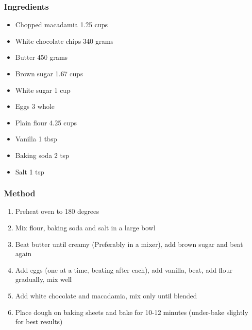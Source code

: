 \documentclass[]{article}
\begin{document}
\subsubsection*{\Large Ingredients}
\begin{multicols}{2}
\begin{itemize}
 \item Chopped macadamia \hfill 1.25 cups
 \item White chocolate chips \hfill 340 grams
 \item Butter \hfill 450 grams
 \item Brown sugar \hfill 1.67 cups
 \item White sugar \hfill 1 cup
 \item Eggs \hfill 3 whole
 \item Plain flour \hfill 4.25 cups
 \item Vanilla \hfill 1 tbsp
 \item Baking soda \hfill 2 tsp
 \item Salt \hfill 1 tsp
\end{itemize}
\end{multicols}
\subsubsection*{\Large Method}
\begin{enumerate}[font=\huge\color{accent}]
	\item Preheat oven to 180 degrees
	\item Mix flour, baking soda and salt in a large bowl
	\item Beat butter until creamy (Preferably in a mixer), add brown sugar and beat again
	\item Add eggs (one at a time, beating after each), add vanilla, beat, add flour gradually, mix well
	\item Add white chocolate and macadamia, mix only until blended
	\item Place dough on baking sheets and bake for 10-12 minutes (under-bake slightly for best results)
\end{enumerate}
\newpage
{}\label{rec:Milo Biscuits}
\end{document}
